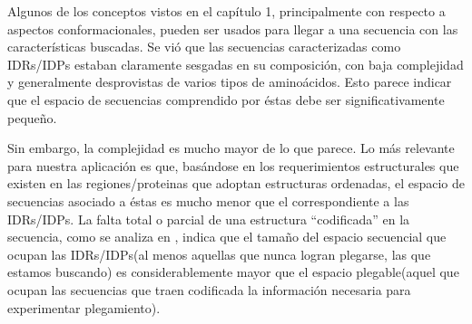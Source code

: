 Algunos de los conceptos vistos en el capítulo 1, principalmente con respecto a aspectos conformacionales, pueden ser usados para llegar a una secuencia con las características buscadas.
Se vió que las secuencias caracterizadas como IDRs/IDPs estaban claramente sesgadas en su composición, con baja complejidad y generalmente desprovistas de varios tipos de aminoácidos.
Esto parece indicar que el espacio de secuencias comprendido por éstas debe ser significativamente pequeño.

Sin embargo, la complejidad es mucho mayor de lo que parece. 
Lo más relevante para nuestra aplicación es que, basándose en los requerimientos estructurales que existen en las regiones/proteinas que adoptan estructuras ordenadas, el espacio de secuencias asociado a éstas es
mucho menor que el correspondiente a las IDRs/IDPs. La falta total o parcial de una estructura ``codificada'' en la secuencia, como se analiza en \cite{uversky2013decade}, 
indica que el tamaño del espacio secuencial que ocupan las IDRs/IDPs(al menos aquellas que nunca logran plegarse, las que estamos buscando) es considerablemente mayor que el 
espacio plegable(aquel que ocupan las secuencias que traen codificada la información necesaria para experimentar plegamiento).

